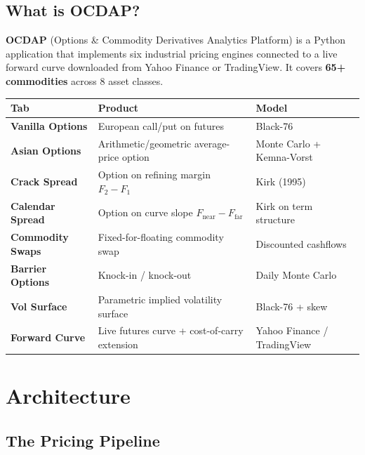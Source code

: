 \documentclass[11pt,a4paper]{article}
\begin{document}
\subsection{What is OCDAP?}

\textbf{OCDAP} (Options \& Commodity Derivatives Analytics Platform) is a
Python application that implements six industrial pricing engines connected
to a live forward curve downloaded from Yahoo Finance or TradingView.
It covers \textbf{65+ commodities} across 8 asset classes.

\begin{center}
\begin{tabularx}{\textwidth}{>{\bfseries}l X l}
\toprule
Tab & Product & Model \\
\midrule
Vanilla Options    & European call/put on futures                     & Black-76 \\
Asian Options      & Arithmetic/geometric average-price option         & Monte Carlo + Kemna-Vorst \\
Crack Spread       & Option on refining margin $F_2 - F_1$            & Kirk (1995) \\
Calendar Spread    & Option on curve slope $F_{\text{near}}-F_{\text{far}}$ & Kirk on term structure \\
Commodity Swaps    & Fixed-for-floating commodity swap                 & Discounted cashflows \\
Barrier Options    & Knock-in / knock-out                              & Daily Monte Carlo \\
Vol Surface        & Parametric implied volatility surface             & Black-76 + skew \\
Forward Curve      & Live futures curve + cost-of-carry extension      & Yahoo Finance / TradingView \\
\bottomrule
\end{tabularx}
\end{center}

\section{Architecture}

\subsection{The Pricing Pipeline}
\end{document}
